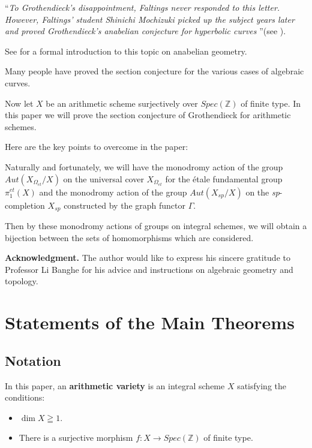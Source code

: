 \documentclass[12pt,twoside,reqno]{amsart}
\theoremstyle{definition}
\numberwithin{equation}{section}
\begin{document}
\textquotedblleft \emph{To Grothendieck's disappointment, Faltings never responded to this letter. However, Faltings' student Shinichi Mochizuki picked up the subject years later and proved Grothendieck's anabelian conjecture for hyperbolic curves} \textquotedblright (see \cite{www}).

See \cite{pop} for a formal introduction to this topic on anabelian geometry.

Many people have proved the section conjecture for the various cases of algebraic curves.

Now let $X$ be an arithmetic scheme surjectively over $Spec(\mathbb{Z})$ of finite type. In this paper we will prove the section conjecture of Grothendieck for arithmetic schemes.

Here are the key points to overcome in the paper:

Naturally and fortunately, we will have the monodromy action of the group $Aut(X_{\Omega_{et}}/X)$  on the universal cover $X_{\Omega_{et}}$ for the \'{e}tale fundamental group $\pi_{1}^{et}(X)$ and the monodromy action of the group $Aut(X_{sp}/X)$  on the \emph{sp}-completion $X_{sp}$ constructed by the graph functor $\Gamma$.

Then by these monodromy actions of groups on integral schemes, we will obtain a bijection between the sets of homomorphisms which are considered.

\textbf{\tiny{Acknowledgment.}} The author would like to express his sincere
gratitude to Professor Li Banghe for his advice and instructions
on algebraic geometry and topology.


\section{Statements of the Main Theorems}

\subsection{Notation}

In this paper, an \textbf{arithmetic variety}  is an integral scheme $X$ satisfying the conditions:
\begin{itemize}
\item $\dim X \geqq 1$.

\item There is a surjective morphism $f:X \to Spec\left( \mathbb{Z}\right) $ of finite type.
\end{itemize}
\end{document}
